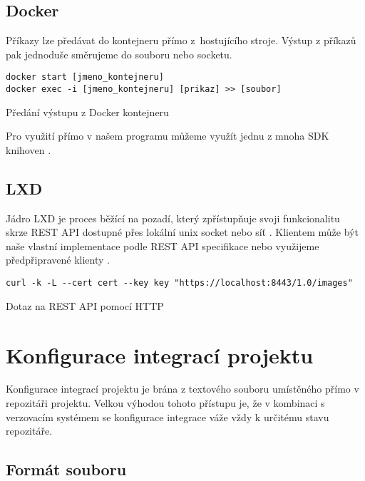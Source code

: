 \subsection{Docker}

Příkazy lze předávat do kontejneru přímo z~hostujícího stroje.
Výstup z příkazů pak jednoduše směrujeme do souboru nebo socketu.

\begin{listing}[ht]
\begin{verbatim}
docker start [jmeno_kontejneru]
docker exec -i [jmeno_kontejneru] [prikaz] >> [soubor]
\end{verbatim}
\caption{Předání výstupu z Docker kontejneru}
\end{listing}

Pro využití přímo v našem programu můžeme využít jednu z mnoha SDK knihoven \cite{docker_sdk}.

\subsection{LXD}

Jádro LXD je proces běžící na pozadí, který zpřístupňuje svoji funkcionalitu skrze REST API dostupné přes lokální unix socket nebo síť \cite{lxd}.
Klientem může být naše vlastní implementace podle REST API specifikace nebo využijeme předpřipravené klienty \cite{lxd_rest}.

\begin{listing}[ht]
\begin{verbatim}
curl -k -L --cert cert --key key "https://localhost:8443/1.0/images"
\end{verbatim}
\caption{Dotaz na REST API pomocí HTTP}
\end{listing}

\section{Konfigurace integrací projektu}

Konfigurace integrací projektu je brána z textového souboru umístěného přímo v repozitáři projektu.
Velkou výhodou tohoto přístupu je, že v kombinaci s verzovacím systémem se konfigurace integrace váže vždy k určitému stavu repozitáře.

\subsection{Formát souboru}

